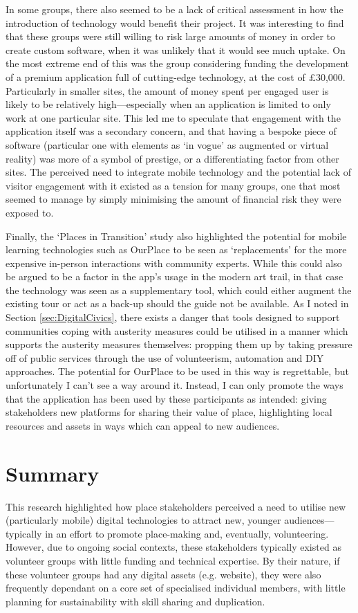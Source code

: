 In some groups, there also seemed to be a lack of critical assessment in how the introduction of technology would benefit their project. It was interesting to find that these groups were still willing to risk large amounts of money in order to create custom software, when it was unlikely that it would see much uptake. On the most extreme end of this was the group considering funding the development of a premium application full of cutting-edge technology, at the cost of £30,000. Particularly in smaller sites, the amount of money spent per engaged user is likely to be relatively high---especially when an application is limited to only work at one particular site. This led me to speculate that engagement with the application itself was a secondary concern, and that having a bespoke piece of software (particular one with elements as `in vogue' as augmented or virtual reality) was more of a symbol of prestige, or a differentiating factor from other sites. The perceived need to integrate mobile technology and the potential lack of visitor engagement with it existed as a tension for many groups, one that most seemed to manage by simply minimising the amount of financial risk they were exposed to.

Finally, the `Places in Transition' study also highlighted the potential for mobile learning technologies such as OurPlace to be seen as `replacements' for the more expensive in-person interactions with community experts. While this could also be argued to be a factor in the app's usage in the modern art trail, in that case the technology was seen as a supplementary tool, which could either augment the existing tour or act as a back-up should the guide not be available. As I noted in Section \ref{sec:DigitalCivics}, there exists a danger that tools designed to support communities coping with austerity measures could be utilised in a manner which supports the austerity measures themselves: propping them up by taking pressure off of public services through the use of volunteerism, automation and DIY approaches. The potential for OurPlace to be used in this way is regrettable, but unfortunately I can't see a way around it. Instead, I can only promote the ways that the application has been used by these participants as intended: giving stakeholders new platforms for sharing their value of place, highlighting local resources and assets in ways which can appeal to new audiences.

\section{Summary}
This research highlighted how place stakeholders perceived a need to utilise new (particularly mobile) digital technologies to attract new, younger audiences---typically in an effort to promote place-making and, eventually, volunteering. However, due to ongoing social contexts, these stakeholders typically existed as volunteer groups with little funding and technical expertise. By their nature, if these volunteer groups had any digital assets (e.g. website), they were also frequently dependant on a core set of specialised individual members, with little planning for sustainability with skill sharing and duplication.

